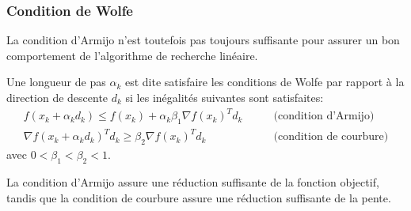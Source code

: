 \documentclass[usepdftitle=false]{beamer}
\begin{document}
\begin{frame}
\frametitle{Condition de Wolfe}

La condition d'Armijo n'est toutefois pas toujours suffisante pour assurer un bon comportement de l'algorithme de recherche linéaire.

\mbox{}

Une longueur de pas $\alpha_k$ est dite satisfaire les conditions de Wolfe par rapport à la direction de descente $d_k$ si les inégalités suivantes sont satisfaites:
\begin{align*}
f(x_k + \alpha_k d_k ) \leq f(x_k) + \alpha_k \beta_1 \nabla f(x_k)^T d_k  & \qquad \mbox{(condition d'Armijo)} \\
\nabla f(x_k + \alpha_k d_k )^T d_k \geq \beta_2 \nabla f(x_k)^T d_k
& \qquad \mbox{(condition de courbure)}
\end{align*}
avec $0 < \beta_1 < \beta_2 < 1$.

\mbox{}

La condition d'Armijo assure une réduction suffisante de la fonction objectif, tandis que la condition de courbure assure une réduction suffisante de la pente.

\end{frame}
\end{document}
